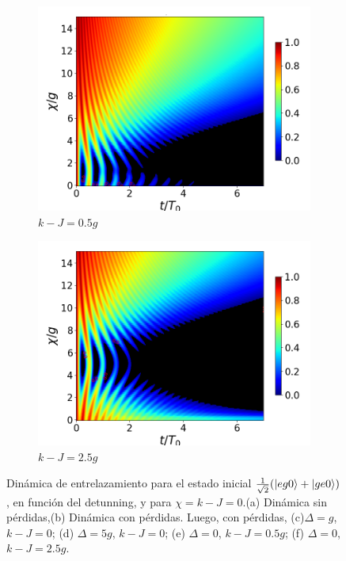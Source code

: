 \begin{figure}[h!]
\begin{subfigure}{0.49\textwidth}
        \includegraphics[width=\textwidth]{figuras/ch4/concu/chi/eg0+ge0 d=0.0g k=0.5g J=0.0g gamma=0.25g concu chi dis.png}
        \caption{$k-J=0.5g$}
        \label{fig4:concu x k1}
    \end{subfigure}
    \hfill
    \begin{subfigure}{0.49\textwidth}
        \includegraphics[width=\textwidth]{figuras/ch4/concu/chi/eg0+ge0 d=0.0g k=2.5g J=0.0g gamma=0.25g concu chi dis.png}
        \caption{$k-J=2.5g$}
        \label{fig4:concu x k2}
    \end{subfigure}
    \caption{Dinámica de entrelazamiento para el estado inicial $\frac{1}{\sqrt{2}}(\ket{eg0}+\ket{ge0})$, en función del detunning, y para $\chi=k-J=0$.(a) Dinámica sin pérdidas,(b) Dinámica con pérdidas. Luego, con pérdidas, (c)$\Delta=g$, $k-J=0$; (d) $\Delta=5g$, $k-J=0$; (e) $\Delta=0$, $k-J=0.5g$; (f) $\Delta=0$, $k-J=2.5g$.}
    \label{fig4:concu x 0}
\end{figure}

